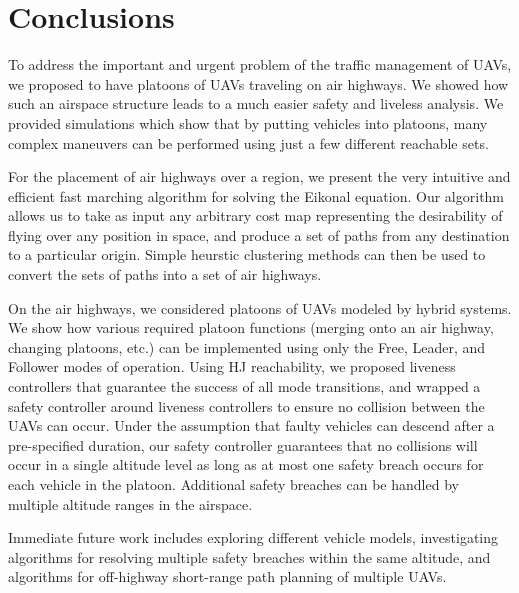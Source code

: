 \section{Conclusions}
To address the important and urgent problem of the traffic management of UAVs, we proposed to have platoons of UAVs traveling on air highways. We showed how such an airspace structure leads to a much easier safety and liveless analysis. We provided simulations which show that by putting vehicles into platoons, many complex maneuvers can be performed using just a few different reachable sets.

For the placement of air highways over a region, we present the very intuitive and efficient fast marching algorithm for solving the Eikonal equation. Our algorithm allows us to take as input any arbitrary cost map representing the desirability of flying over any position in space, and produce a set of paths from any destination to a particular origin. Simple heurstic clustering methods can then be used to convert the sets of paths into a set of air highways.

On the air highways, we considered platoons of UAVs modeled by hybrid systems. We show how various required platoon functions (merging onto an air highway, changing platoons, etc.) can be implemented using only the Free, Leader, and Follower modes of operation. Using HJ reachability, we proposed liveness controllers that guarantee the success of all mode transitions, and wrapped a safety controller around liveness controllers to ensure no collision between the UAVs can occur. Under the assumption that faulty vehicles can descend after a pre-specified duration, our safety controller guarantees that no collisions will occur in a single altitude level as long as at most one safety breach occurs for each vehicle in the platoon. Additional safety breaches can be handled by multiple altitude ranges in the airspace. 

Immediate future work includes exploring different vehicle models, investigating algorithms for resolving multiple safety breaches within the same altitude, and algorithms for off-highway short-range path planning of multiple UAVs.